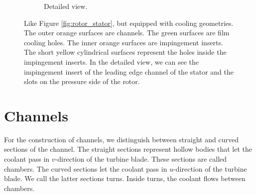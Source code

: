 \documentclass[a4paper, 11pt]{report}
\theoremstyle{definition}
\begin{document}
\begin{figure}[H]
\begin{subfigure}{.49\textwidth}
			\caption{Detailed view.}
		\end{subfigure}		
		\caption{Like Figure \ref{fig:rotor_stator}, but equipped with cooling geometries. The outer orange surfaces are channels. The green surfaces are film cooling holes. The inner orange surfaces are impingement inserts. The short yellow cylindrical surfaces represent the holes inside the impingement inserts. In the detailed view, we can see the impingement insert of the leading edge channel of the stator and the slots on the pressure side of the rotor.}
		\label{fig:results_complete}
	\end{figure}

\section{Channels}
	 For the construction of channels, we distinguish between straight and curved sections of the channel. The straight sections represent hollow bodies that let the coolant pass in $v$-direction of the turbine blade. These sections are called chambers. The curved sections let the coolant pass in $u$-direction of the turbine blade. We call the latter sections turns. Inside turns, the coolant flows between chambers.
\end{document}
